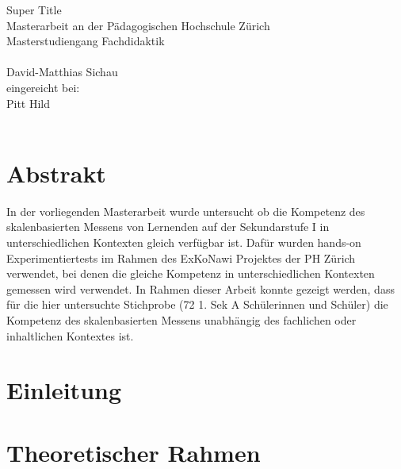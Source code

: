 \documentclass[12pt,oneside, DIV11]{scrbook}
\begin{document}
\frontmatter

\begin{titlepage}
	\vspace*{2cm}
	\begin{center}
		{\LARGE Super Title \vspace*{2cm}\\ Masterarbeit an der Pädagogischen Hochschule Zürich\vspace*{1cm}\\Masterstudiengang Fachdidaktik\\}
		\vspace*{2cm}{\normalsize vorgelegt von:}\\ \large David-Matthias Sichau \\
		\vspace*{1.5cm} {\normalsize  eingereicht bei:}\\ \large Pitt Hild \\
		\vspace*{2cm}{\large 05. Februar 2015, Zürich}\\
	\end{center}
\end{titlepage}



\frontmatter 
\tableofcontents



\chapter*{Abstrakt}

In der vorliegenden Masterarbeit wurde untersucht ob die Kompetenz des skalenbasierten Messens von Lernenden auf der Sekundarstufe I in unterschiedlichen Kontexten gleich verfügbar ist. Dafür wurden hands-on Experimentiertests im Rahmen des ExKoNawi Projektes der PH Zürich verwendet, bei denen die gleiche Kompetenz in unterschiedlichen Kontexten gemessen wird verwendet. In Rahmen dieser Arbeit konnte gezeigt werden, dass für die hier untersuchte Stichprobe (72 1. Sek A Schülerinnen und Schüler) die Kompetenz des skalenbasierten Messens unabhängig des fachlichen oder inhaltlichen Kontextes ist.





\mainmatter


\chapter{Einleitung}

\chapter{Theoretischer Rahmen}

\end{document}
